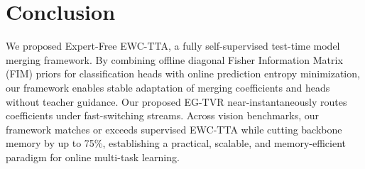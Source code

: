\documentclass{article}
\theoremstyle{plain}
\theoremstyle{definition}
\theoremstyle{remark}
\begin{document}
\section{Conclusion}
\label{sec:conclusion}
We proposed Expert-Free EWC-TTA, a fully self-supervised test-time model merging framework. By combining offline diagonal Fisher Information Matrix (FIM) priors for classification heads with online prediction entropy minimization, our framework enables stable adaptation of merging coefficients and heads without teacher guidance. Our proposed EG-TVR near-instantaneously routes coefficients under fast-switching streams. Across vision benchmarks, our framework matches or exceeds supervised EWC-TTA while cutting backbone memory by up to 75\%, establishing a practical, scalable, and memory-efficient paradigm for online multi-task learning.



\end{document}
